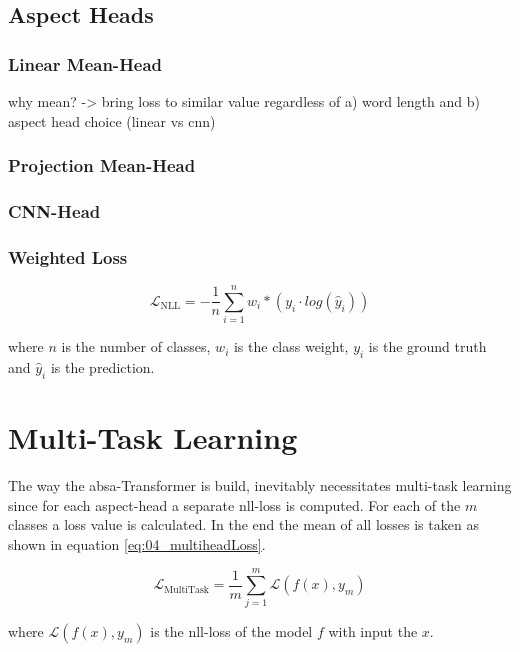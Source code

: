 \subsection{Aspect Heads}
\label{sec:04_aspectHeads}

\subsubsection{Linear Mean-Head}

why mean? -> bring loss to similar value regardless of a) word length and b) aspect head choice (linear vs cnn)

\subsubsection{Projection Mean-Head}

\subsubsection{CNN-Head}

\subsubsection*{Weighted Loss}

\begin{equation}
\mathcal{L}_\text{NLL}=-\frac{1}{n}\sum_{i=1}^{n} w_i * (y_i \cdot log(\hat{y}_i))
\label{eq:04_nll}
\end{equation}

where $n$ is the number of classes, $w_i$ is the class weight, $y_i$ is the ground truth and $\hat{y}_i$ is the prediction.

\section{Multi-Task Learning}
\label{sec:04_multitask}
The way the \gls{absa}-Transformer is build, inevitably necessitates multi-task learning since for each aspect-head a separate \gls{nll}-loss is computed. For each of the $m$ classes a loss value is calculated. In the end the mean of all losses is taken as shown in equation \ref{eq:04_multiheadLoss}.

\begin{equation}
\mathcal{L}_\text{MultiTask} = \frac{1}{m}\sum_{j=1}^{m}\mathcal{L}(f(x), y_m)
\label{eq:04_multiheadLoss}
\end{equation}

where $\mathcal{L}(f(x), y_m)$ is the \gls{nll}-loss of the model $f$ with input the $x$.

